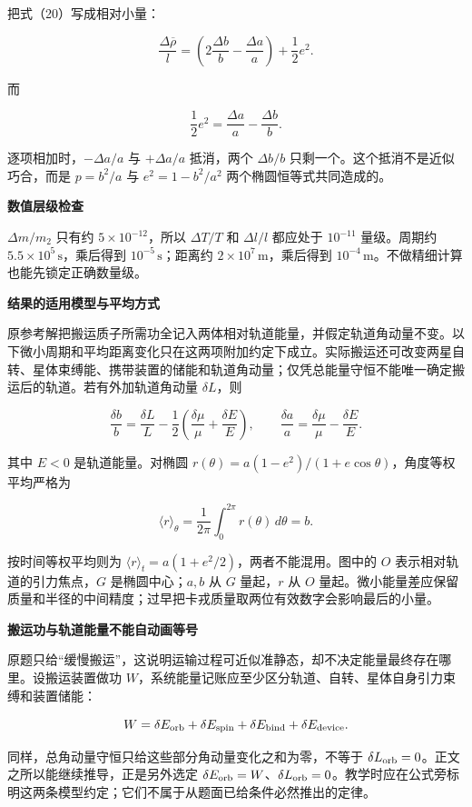 \documentclass[12pt,a4paper,UTF8]{ctexart}
\begin{document}
把式（20）写成相对小量：

\[
\frac{\Delta\overline\rho}{l}
=\left(2\frac{\Delta b}{b}-\frac{\Delta a}{a}\right)
+\frac12e^2.
\]

而

\[
\frac12e^2=\frac{\Delta a}{a}-\frac{\Delta b}{b}.
\]

逐项相加时，\(-\Delta a/a\) 与 \(+\Delta a/a\) 抵消，两个 \(\Delta b/b\)
只剩一个。这个抵消不是近似巧合，而是 \(p=b^2/a\) 与 \(e^2=1-b^2/a^2\)
两个椭圆恒等式共同造成的。

\textbf{数值层级检查}

\(\Delta m/m_2\) 只有约 \(5\times10^{-12}\)，所以 \(\Delta T/T\) 和
\(\Delta l/l\) 都应处于 \(10^{-11}\) 量级。周期约
\(5.5\times10^5\,\mathrm s\)，乘后得到 \(10^{-5}\,\mathrm s\)；距离约
\(2\times10^7\,\mathrm m\)，乘后得到
\(10^{-4}\,\mathrm m\)。不做精细计算也能先锁定正确数量级。

\textbf{结果的适用模型与平均方式}

原参考解把搬运质子所需功全记入两体相对轨道能量，并假定轨道角动量不变。以下微小周期和平均距离变化只在这两项附加约定下成立。实际搬运还可改变两星自转、星体束缚能、携带装置的储能和轨道角动量；仅凭总能量守恒不能唯一确定搬运后的轨道。若有外加轨道角动量
\(\delta L\)，则

\[\frac{\delta b}{b}=\frac{\delta L}{L}-\frac12\left(\frac{\delta\mu}{\mu}+\frac{\delta E}{E}\right),\qquad \frac{\delta a}{a}=\frac{\delta\mu}{\mu}-\frac{\delta E}{E}.\]

其中 \(E<0\) 是轨道能量。对椭圆
\(r(\theta)=a(1-e^2)/(1+e\cos\theta)\)，角度等权平均严格为

\[\langle r\rangle_\theta=\frac1{2\pi}\int_0^{2\pi}r(\theta)\,d\theta=b.\]

按时间等权平均则为
\(\langle r\rangle_t=a(1+e^2/2)\)，两者不能混用。图中的 \(O\)
表示相对轨道的引力焦点，\(G\) 是椭圆中心；\(a,b\) 从 \(G\) 量起，\(r\)
从 \(O\)
量起。微小能量差应保留质量和半径的中间精度；过早把卡戎质量取两位有效数字会影响最后的小量。

\textbf{搬运功与轨道能量不能自动画等号}

原题只给``缓慢搬运''，这说明运输过程可近似准静态，却不决定能量最终存在哪里。设搬运装置做功
\(W\)，系统能量记账应至少区分轨道、自转、星体自身引力束缚和装置储能：

\[W=\delta E_{\rm orb}+\delta E_{\rm spin}+\delta E_{\rm bind}+\delta E_{\rm device}.\]

同样，总角动量守恒只给这些部分角动量变化之和为零，不等于
\(\delta L_{\rm orb}=0\)。正文之所以能继续推导，正是另外选定
\(\delta E_{\rm orb}=W\)、\(\delta L_{\rm orb}=0\)。教学时应在公式旁标明这两条模型约定；它们不属于从题面已给条件必然推出的定律。
\end{document}
